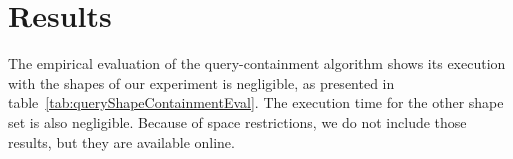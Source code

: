 \section{Results}

The empirical evaluation of the query-containment algorithm shows its execution with the shapes of our experiment is negligible, as presented in table~\ref{tab:queryShapeContainmentEval}.
The execution time for the other shape set is also negligible. Because of space restrictions, we do not include those results, but they are available online.


